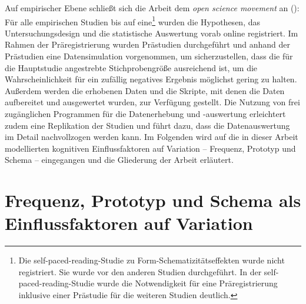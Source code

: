 Auf empirischer Ebene schließt sich die Arbeit dem \textit{open science movement} an (\cite[257--292]{Cumming.2017}): Für alle empirischen Studien bis auf eine\footnote{Die self-paced-reading-Studie zu Form-Schematizitätseffekten wurde nicht registriert. Sie wurde vor den anderen Studien durchgeführt. In der self-paced-reading-Studie wurde die Notwendigkeit für eine Präregistrierung inklusive einer Prästudie für die weiteren Studien deutlich.} wurden die Hypothesen, das Untersuchungsdesign und die statistische Auswertung vorab online registriert. Im Rahmen der Präregistrierung wurden Prästudien durchgeführt und anhand der Prästudien eine Datensimulation vorgenommen, um sicherzustellen, dass die für die Hauptstudie angestrebte Stichprobengröße ausreichend ist, um die Wahrscheinlichkeit für ein zufällig negatives Ergebnis möglichst gering zu halten. Außerdem werden die erhobenen Daten und die Skripte, mit denen die Daten aufbereitet und ausgewertet wurden, zur Verfügung gestellt. Die Nutzung von frei zugänglichen Programmen für die Datenerhebung und -auswertung erleichtert zudem eine Replikation der Studien und führt dazu, dass die Datenauswertung im Detail nachvollzogen werden kann. Im Folgenden wird auf die in dieser Arbeit modellierten kognitiven Einflussfaktoren auf Variation -- Frequenz, Prototyp und Schema -- eingegangen und die Gliederung der Arbeit erläutert.

\section{Frequenz, Prototyp und Schema als Einflussfaktoren auf Variation}
\label{faktoren}\largerpage[-1]

